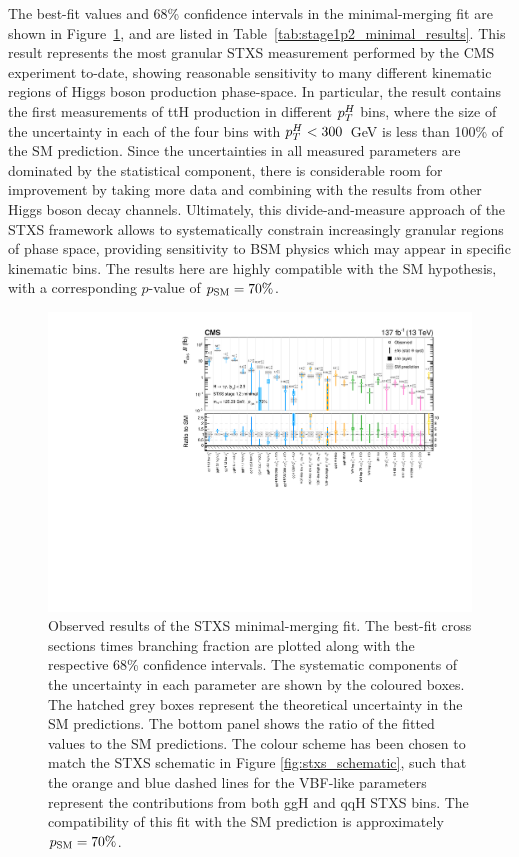 The \xsbr best-fit values and 68\% confidence intervals in the minimal-merging fit are shown in Figure~\ref{fig:stage1p2_minimal_results}, and are listed in Table~\ref{tab:stage1p2_minimal_results}. This result represents the most granular STXS measurement performed by the CMS experiment to-date, showing reasonable sensitivity to many different kinematic regions of Higgs boson production phase-space. In particular, the result contains the first measurements of ttH production in different $p_T^H$ bins, where the size of the uncertainty in each of the four bins with $p_T^H<300$~GeV is less than 100\% of the SM prediction. Since the uncertainties in all measured parameters are dominated by the statistical component, there is considerable room for improvement by taking more data and combining with the results from other Higgs boson decay channels. Ultimately, this divide-and-measure approach of the STXS framework allows to systematically constrain increasingly granular regions of phase space, providing sensitivity to BSM physics which may appear in specific kinematic bins. The results here are highly compatible with the SM hypothesis, with a corresponding $p$-value of $p_{\rm{SM}}=70\%$.

\begin{figure}
  \centering
  \hspace*{-1.3cm}
  \includegraphics[width=1.2\textwidth]{Figures/hgg_results/stage1p2_minimal_summary.pdf}
  \hspace*{-1.3cm}
  \caption[Results of the minimal-merging fit]
  {
    Observed results of the STXS minimal-merging fit. The best-fit cross sections times branching fraction are plotted along with the respective 68\% confidence intervals. The systematic components of the uncertainty in each parameter are shown by the coloured boxes. The hatched grey boxes represent the theoretical uncertainty in the SM predictions. The bottom panel shows the ratio of the fitted values to the SM predictions. The colour scheme has been chosen to match the STXS schematic in Figure \ref{fig:stxs_schematic}, such that the orange and blue dashed lines for the VBF-like parameters represent the contributions from both ggH and qqH STXS bins. The compatibility of this fit with the SM prediction is approximately $p_{\rm{SM}}=70\%$. 
  }
  \label{fig:stage1p2_minimal_results}
\end{figure}

